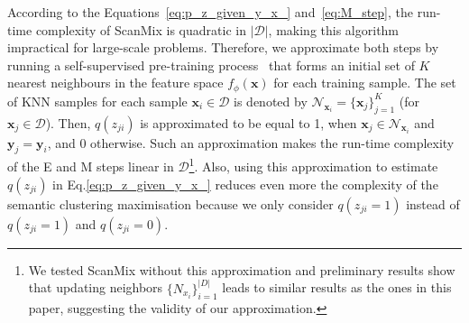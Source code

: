 \documentclass[review]{elsarticle}
\theoremstyle{plain}
\begin{document}
According to the Equations~\ref{eq:p_z_given_y_x_} and~\ref{eq:M_step}, the run-time complexity of ScanMix is quadratic in $|\mathcal{D}|$, making this algorithm impractical for large-scale problems.  Therefore, we approximate both steps by running a self-supervised pre-training process~\citep{SimCLR,MoCo,MoCoV2,SCAN} that forms an initial set of $K$ nearest neighbours in the feature space $f_{\phi}(\mathbf{x})$ for each training sample.  
The set of KNN samples for each sample $\mathbf{x}_i \in \mathcal{D}$ is denoted by $\mathcal{N}_{\mathbf{x}_{i}} = \{ \mathbf{x}_j \}_{j=1}^K$ (for $\mathbf{x}_j \in \mathcal{D}$).
Then, $q(z_{ji})$ is approximated to be equal to 1, when $\mathbf{x}_j \in \mathcal{N}_{\mathbf{x}_{i}}$ and $\mathbf{y}_j=\mathbf{y}_i$, and 0 otherwise. Such an approximation makes the run-time complexity of the E and M steps linear in $\mathcal{D}$\footnote{We tested ScanMix without this approximation and preliminary results show that updating neighbors $\{N_{x_i}\}_{i=1}^{|D|}$ leads to similar results as the ones in this paper, suggesting the validity of our approximation.}. Also, using this approximation to estimate $q(z_{ji})$ in Eq.\ref{eq:p_z_given_y_x_} reduces even more the complexity of the semantic clustering maximisation because we
only consider $q(z_{ji}=1)$ instead of $q(z_{ji}=1)$ and $q(z_{ji}=0)$.
\end{document}
